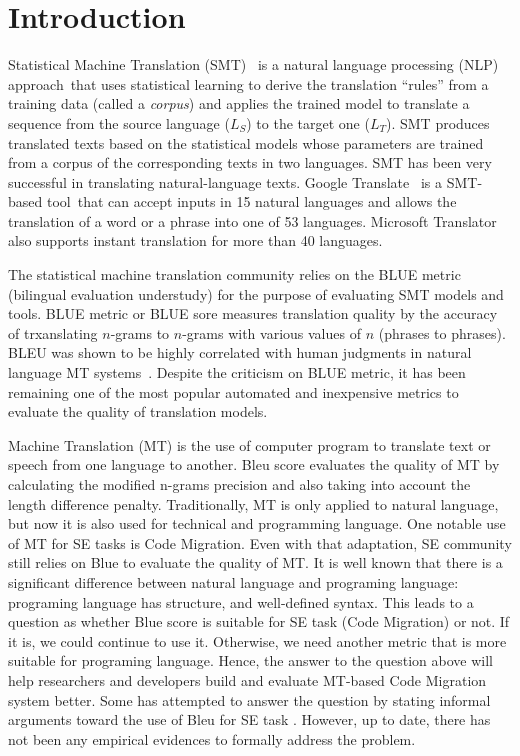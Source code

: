 \section{Introduction}
\label{sec:intro}

Statistical Machine Translation (SMT)~\cite{smtbook} is a natural
language processing (NLP) approach~that uses statistical learning to
derive the translation ``rules'' from a training data (called a {\em
  corpus}) and applies the trained model to translate a sequence from
the source language ($L_S$) to the target one ($L_T$). SMT produces
translated texts based on the statistical models whose parameters are
trained from a corpus of the corresponding texts in two languages. SMT
has been very successful in translating natural-language texts.
Google Translate~\cite{googletranslate} is a SMT-based tool~that can
accept inputs in 15 natural languages and allows the translation of a
word or a phrase into one of 53 languages.  Microsoft
Translator~\cite{mstranslator} also supports instant translation for
more than 40 languages.

The statistical machine translation community relies on the BLUE
metric (bilingual evaluation understudy) for the purpose of evaluating
SMT models and tools.
%
%
BLUE metric or BLUE sore measures translation quality by the accuracy
of trxanslating $n$-grams to $n$-grams with various values of $n$
(phrases to phrases). BLEU was shown to be highly correlated with
human judgments in natural language MT systems~\cite{Papineni2002}.
Despite the criticism on BLUE metric, it has been remaining one of the
most popular automated and inexpensive metrics to evaluate the quality
of translation models.





Machine Translation (MT) is the use of computer program to translate
text or speech from one language to another. Bleu score evaluates the
quality of MT by calculating the modified n-grams precision and also
taking into account the length difference penalty. Traditionally, MT
is only applied to natural language, but now it is also used for
technical and programming language. One notable use of MT for SE tasks
is Code Migration. Even with that adaptation, SE community still
relies on Blue to evaluate the quality of MT. It is well known that
there is a significant difference between natural language and
programing language: programing language has structure, and
well-defined syntax. This leads to a question as whether Blue score is
suitable for SE task (Code Migration) or not. If it is, we could
continue to use it. Otherwise, we need another metric that is more
suitable for programing language. Hence, the answer to the question
above will help researchers and developers build and evaluate MT-based
Code Migration system better. Some has attempted to answer the
question by stating informal arguments toward the use of Bleu for SE
task \cite{}. However, up to date, there has not been any empirical
evidences to formally address the problem.

